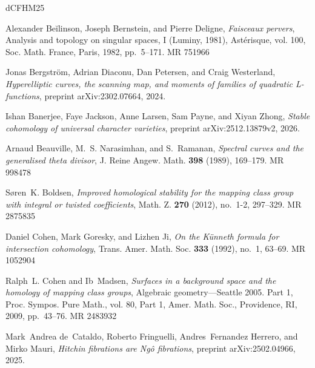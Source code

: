 \documentclass[11pt,reqno]{amsart}
\theoremstyle{plain} %
\theoremstyle{definition}
\begin{document}
\newcommand{\etalchar}[1]{$^{#1}$}
\providecommand{\bysame}{\leavevmode\hbox to3em{\hrulefill}\thinspace}
\providecommand{\MR}{\relax\ifhmode\unskip\space\fi MR }
\providecommand{\MRhref}[2]{%
  \href{http://www.ams.org/mathscinet-getitem?mr=#1}{#2}
}
\providecommand{\href}[2]{#2}
\begin{thebibliography}{dCFHM25}

Alexander Be\u{i}linson, Joseph Bernstein, and Pierre Deligne, \emph{Faisceaux
  pervers}, Analysis and topology on singular spaces, {I} ({L}uminy, 1981),
  Ast\'erisque, vol. 100, Soc. Math. France, Paris, 1982, pp.~5--171.
  \MR{751966}

Jonas Bergstr\"om, Adrian Diaconu, Dan Petersen, and Craig Westerland,
  \emph{Hyperelliptic curves, the scanning map, and moments of families of
  quadratic {L}-functions}, preprint arXiv:2302.07664, 2024.

\bibitem[BJL{\etalchar{+}}26]{BJLPZv2}
Ishan Banerjee, Faye Jackson, Anne Larsen, Sam Payne, and Xiyan Zhong,
  \emph{Stable cohomology of universal character varieties}, preprint
  arXiv:2512.13879v2, 2026.

Arnaud Beauville, M.~S. Narasimhan, and S.~Ramanan, \emph{Spectral curves and
  the generalised theta divisor}, J. Reine Angew. Math. \textbf{398} (1989),
  169--179. \MR{998478}

S\o ren~K. Boldsen, \emph{Improved homological stability for the mapping class
  group with integral or twisted coefficients}, Math. Z. \textbf{270} (2012),
  no.~1-2, 297--329. \MR{2875835}

Daniel Cohen, Mark Goresky, and Lizhen Ji, \emph{On the {K}\"unneth formula for
  intersection cohomology}, Trans. Amer. Math. Soc. \textbf{333} (1992), no.~1,
  63--69. \MR{1052904}

Ralph~L. Cohen and Ib~Madsen, \emph{Surfaces in a background space and the
  homology of mapping class groups}, Algebraic geometry---{S}eattle 2005.
  {P}art 1, Proc. Sympos. Pure Math., vol. 80, Part 1, Amer. Math. Soc.,
  Providence, RI, 2009, pp.~43--76. \MR{2483932}

Mark~Andrea de~Cataldo, Roberto Fringuelli, Andres~Fernandez Herrero, and Mirko
  Mauri, \emph{Hitchin fibrations are {N}g\^{o} fibrations}, preprint
  arXiv:2502.04966, 2025.


\end{thebibliography}
\end{document}
